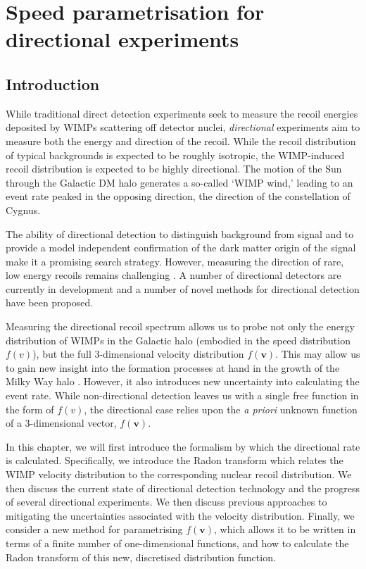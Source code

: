 \chapter[Directional detection]{Speed parametrisation for directional experiments}

\section{Introduction}

While traditional direct detection experiments seek to measure the recoil energies deposited by WIMPs scattering off detector nuclei, \textit{directional} experiments aim to measure both the energy and direction of the recoil. While the recoil distribution of typical backgrounds is expected to be roughly isotropic, the WIMP-induced recoil distribution is expected to be highly directional. The motion of the Sun through the Galactic DM halo generates a so-called `WIMP wind,' leading to an event rate peaked in the opposing direction, the direction of the constellation of Cygnus. 

The ability of directional detection to distinguish background from signal and to provide a model independent confirmation of the dark matter origin of the signal make it a promising search strategy. However, measuring the direction of rare, low energy recoils remains challenging \cite{}. A number of directional detectors are currently in development and a number of novel methods for directional detection have been proposed.

Measuring the directional recoil spectrum allows us to probe not only the energy distribution of WIMPs in the Galactic halo (embodied in the speed distribution $f(v)$), but the full 3-dimensional velocity distribution $f(\textbf{v})$. This may allow us to gain new insight into the formation processes at hand in the growth of the Milky Way halo \cite{}. However, it also introduces new uncertainty into calculating the event rate. While non-directional detection leaves us with a single free function in the form of  $f(v)$, the directional case relies upon the \textit{a priori} unknown function of a 3-dimensional vector, $f(\textbf{v})$.

In this chapter, we will first introduce the formalism by which the directional rate is calculated. Specifically, we introduce the Radon transform which relates the WIMP velocity distribution to the corresponding nuclear recoil distribution.  We then discuss the current state of directional detection technology and the progress of several directional experiments. We then discuss previous approaches to mitigating the uncertainties associated with the velocity distribution. Finally, we consider a new method for parametrising $f(\textbf{v})$, which allows it to be written in terms of a finite number of one-dimensional functions, and how to calculate the Radon transform of this new, discretised distribution function.

